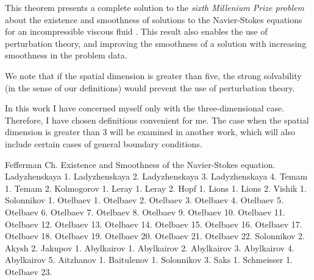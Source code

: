 \documentclass{article}
\numberwithin{equation}{section}
\begin{document}
This theorem presents a complete solution to the \emph{sixth Millenium Prize
problem} about the existence and smoothness of solutions to the Navier-Stokes
equations for an incompressible viscous fluid \cite{clay}. This result also
enables the use of perturbation theory, and improving the smoothness of a
solution with increasing smoothness in the problem data.

We note that if the spatial dimension is greater than five, the strong
solvability (in the sense of our definitions) would prevent the use of
perturbation theory.

In this work I have concerned myself only with the three-dimensional case.
Therefore, I have chosen definitions convenient for me. The case when the
spatial dimension is greater than 3 will be examined in another work, which
will also include certain cases of general boundary conditions.

\begin{thebibliography}{99}
     Fefferman Ch. Existence and Smoothness of the Navier-Stokes
        equation.
     Ladyzhenskaya 1.
     Ladyzhenskaya 2.
     Ladyzhenskaya 3.
     Ladyzhenskaya 4.
     Temam 1.
     Temam 2.
     Kolmogorov 1.
     Leray 1.
     Leray 2.
     Hopf 1.
     Lions 1.
     Lions 2.
     Vishik 1.
     Solonnikov 1.
     Otelbaev 1.
     Otelbaev 2.
     Otelbaev 3.
     Otelbaev 4.
     Otelbaev 5.
     Otelbaev 6.
     Otelbaev 7.
     Otelbaev 8.
     Otelbaev 9.
     Otelbaev 10.
     Otelbaev 11.
     Otelbaev 12.
     Otelbaev 13.
     Otelbaev 14.
     Otelbaev 15.
     Otelbaev 16.
     Otelbaev 17.
     Otelbaev 18.
     Otelbaev 19.
     Otelbaev 20.
     Otelbaev 21.
     Otelbaev 22.
     Solonnikov 2.
     Akysh 2.
     Jakupov 1.
     Abylkairov 1.
     Abylkairov 2.
     Abylkairov 3.
     Abylkairov 4.
     Abylkairov 5.
     Aitzhanov 1.
     Baitulenov 1.
     Solonnikov 3.
     Saks 1.
     Schmeisser 1.
     Otelbaev 23.
\end{thebibliography}


\end{document}
